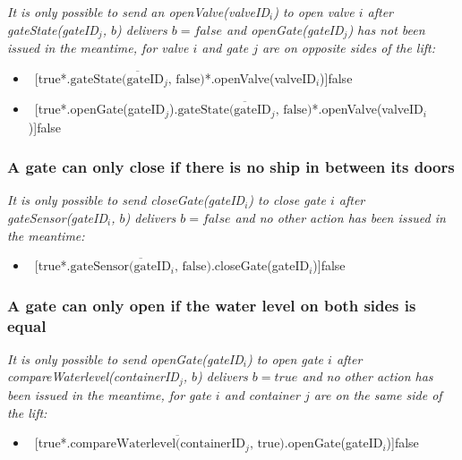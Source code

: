 \textit{It is only possible to send an openValve(valveID$_i$) to open valve $i$ after gateState(gateID$_j$, $ b $) delivers $b = false$ and openGate(gateID$_j$) has not been issued in the meantime, for valve $i$ and gate $j$ are on opposite sides of the lift:}
	\begin{itemize}
		\item ~[true*.$\overline{\textrm{gateState(gateID$_j$, false)}}$*.openValve(valveID$_i$)]false
		\item ~[true*.openGate(gateID$_j$).$\overline{\textrm{gateState(gateID$_j$, false)}}$*.openValve(valveID$_i$)]false
	\end{itemize}
	
\subsubsection{A gate can only close if there is no ship in between its doors}
\textit{It is only possible to send closeGate(gateID$_i$) to close gate $i$ after gateSensor(gateID$_i$, $b$) delivers $b = false$ and no other action has been issued in the meantime:}
	\begin{itemize}
		\item ~[true*.$\overline{\textrm{gateSensor(gateID$_i$, false)}}$.closeGate(gateID$_i$)]false
	\end{itemize}
	
\subsubsection{A gate can only open if the water level on both sides is equal}
\textit{It is only possible to send openGate(gateID$_i$) to open gate $i$ after \linebreak compareWaterlevel(containerID$_j$, $b$) delivers $b = true$ and no other action has been issued in the meantime, for gate $i$ and container $j$ are on the same side of the lift:}
	\begin{itemize}
		\item ~[true*.$\overline{\textrm{compareWaterlevel(containerID$_j$, true)}}$.openGate(gateID$_i$)]false
	\end{itemize}

